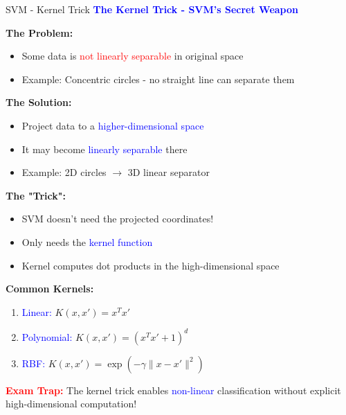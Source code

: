 \documentclass[8pt]{beamer}
\begin{document}
	\begin{frame}{SVM - Kernel Trick}
		\fontsize{6.5}{7.5}\selectfont
		\textcolor{blue}{\textbf{The Kernel Trick - SVM's Secret Weapon}}
		
		\textbf{The Problem:}
		\begin{itemize}
			\item Some data is \textcolor{red}{not linearly separable} in original space
			\item Example: Concentric circles - no straight line can separate them
		\end{itemize}
		
		\textbf{The Solution:}
		\begin{itemize}
			\item Project data to a \textcolor{blue}{higher-dimensional space}
			\item It may become \textcolor{blue}{linearly separable} there
			\item Example: 2D circles $\rightarrow$ 3D linear separator
		\end{itemize}
		
		\textbf{The "Trick":}
		\begin{itemize}
			\item SVM doesn't need the projected coordinates!
			\item Only needs the \textcolor{blue}{kernel function}
			\item Kernel computes dot products in the high-dimensional space
		\end{itemize}
		
		\textbf{Common Kernels:}
		\begin{enumerate}
			\item \textcolor{blue}{Linear:} $K(x, x') = x^T x'$
			\item \textcolor{blue}{Polynomial:} $K(x, x') = (x^T x' + 1)^d$
			\item \textcolor{blue}{RBF:} $K(x, x') = \exp(-\gamma \|x - x'\|^2)$
		\end{enumerate}
		
		\textcolor{red}{\textbf{Exam Trap:}} The kernel trick enables \textcolor{blue}{non-linear} classification without explicit high-dimensional computation!
	\end{frame}
	
\end{document}
